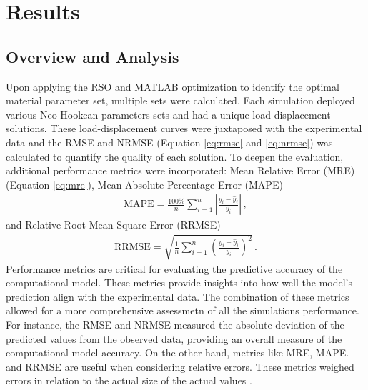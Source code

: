 
\chapter{Results} %
\label{resultschapter} %

\section{Overview and Analysis}
Upon applying the RSO and MATLAB optimization to identify the optimal material parameter set, 
multiple sets were calculated. 
Each simulation deployed various Neo-Hookean parameters sets and 
had a unique load-displacement solutions. These load-displacement curves were 
juxtaposed with the experimental data and the RMSE and NRMSE (Equation \ref{eq:rmse} and \ref{eq:nrmse}) was calculated to quantify the quality 
of each solution. To deepen the evaluation, additional performance metrics were incorporated: 
Mean Relative Error (MRE) (Equation \ref{eq:mre}), Mean Absolute Percentage Error (MAPE)
\begin{align}
    \text{MAPE} = \frac{100\%}{n} \sum_{i=1}^{n} \left| \frac{y_i - \hat{y}_i}{y_i} \right| \,,
\end{align}
and  Relative Root Mean Square Error (RRMSE)  
\begin{align}
    \text{RRMSE} = \sqrt{\frac{1}{n} \sum_{i=1}^{n} \left( \frac{y_i - \hat{y}_i}{y_i} \right)^2} \,.
\end{align}
Performance metrics are critical for evaluating the predictive accuracy of the computational model.
These metrics provide insights into how well the model's prediction align with the 
experimental data. The combination of these metrics allowed for a more comprehensive 
assessmetn of all the simulations performance. For instance, the RMSE and NRMSE measured the
absolute deviation of the predicted values from the observed data, providing an overall 
measure of the computational model accuracy. On the other hand, metrics like MRE, MAPE. and 
RRMSE are useful when considering relative errors. These metrics weighed errors in relation
to the actual size of the actual values \cite{Rajagukguk2020}.\\

